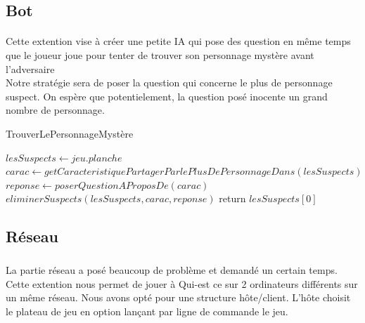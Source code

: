 \documentclass[a4paper]{article}
\begin{document}
 \subsection{Bot}
 \paragraph{}
 Cette extention vise à créer une petite IA qui pose des question en même temps que le joueur joue pour tenter de trouver son personnage mystère avant l'adversaire\\
 Notre stratégie sera de poser la question qui concerne le plus de personnage suspect. On espère que potentielement, la question posé inocente un grand nombre de personnage.
 \begin{algorithm}
  \caption{TrouverLePersonnageMystère}
  \begin{algorithmic}[1]
    \State $lesSuspects \gets jeu.planche$ 
    \State $carac \gets getCaracteristiquePartagerParlePlusDePersonnageDans(lesSuspects)$
    \State $reponse \gets poserQuestionAProposDe(carac)$
    \State $eliminerSuspects(lesSuspects, carac, reponse)$
    \EndWhile
    \State return $lesSuspects[0]$
  \end{algorithmic}
\end{algorithm}


 \subsection{Réseau}

 \paragraph*{}
 \subparagraph*{}
 La partie réseau a posé beaucoup de problème et demandé un certain temps.
 Cette extention nous permet de jouer à Qui-est ce sur 2 ordinateurs différents sur un même réseau.
 Nous avons opté pour une structure hôte/client.
 L'hôte choisit le plateau de jeu en option lançant par ligne de commande le jeu. 
\end{document}
